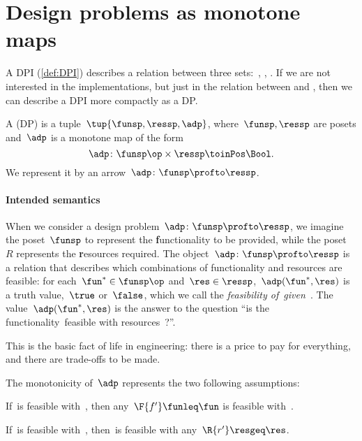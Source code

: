 

\section{Design problems as monotone maps}
\label{sec:dpdefinition}

A DPI (\cref{def:DPI}) describes a relation between three sets:~\funsp, \ressp, \impsp.
If we are not interested in the implementations, but just in the relation between \funsp and \ressp, then we can describe a DPI more compactly as a DP\@.

\begin{definition} \label{def:design-problem}
    A  (DP) is a tuple~$\tup{\funsp, \ressp, \adp}$,
    where~$\funsp, \ressp$ are posets and~$\adp$ is a monotone map of the form
    \begin{equation*}
        \adp \colon  \funsp\op \times \ressp \toinPos \Bool.
    \end{equation*}
    We represent it by an arrow~$\adp \colon \funsp \profto \ressp$.
\end{definition}

\paragraph{Intended semantics}
When we consider a design problem~$\adp\colon \funsp \profto \ressp$, we imagine the poset~$\funsp$ to represent the \textbf{f}unctionality to be provided, while the poset~$R$ represents the \textbf{r}esources required.
The object~$\adp \colon \funsp \profto \ressp$ is a relation that describes which combinations of functionality and resources are feasible: for each~$\fun^* \in \funsp\op$ and~$\res \in \ressp$,~$\adp(\fun^*,\res)$ is a truth value,~$\true$ or~$\false$, which we call the \emph{feasibility of~\fun given~\res}. The value~$\adp(\fun^*,\res)$ is the answer to the question ``is the functionality~\fun feasible with resources~\res?''.

This is the basic fact of life in engineering: there is a price to pay for everything, and there are trade-offs to be made.

The monotonicity of~$\adp$ represents the two following assumptions:

\begin{compactenum}
    \item If~\fun is feasible with~\res, then any~$\F{f'} \funleq \fun$ is feasible with~\res.
    \item If~\fun is feasible with~\res, then~\fun is feasible with any~$\R{r'} \resgeq \res$.
\end{compactenum}

